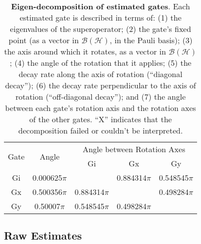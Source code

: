 \documentclass{article}[11pt]
\begin{document}
\begin{table}[h]
\begin{center}
\vspace{2em}
\begin{tabular}[l]{|c|c|c|c|c|}
\hline
\multirow{2}{*}{Gate} & \multirow{2}{*}{Angle} & \multicolumn{3}{c|}{Angle between Rotation Axes} \\ \cline{3-5}
 & & Gi & Gx & Gy \\ \hline
Gi & 0.000625$\pi$ &  & 0.884314$\pi$ & 0.548545$\pi$ \\ \hline
Gx & 0.500356$\pi$ & 0.884314$\pi$ &  & 0.498284$\pi$ \\ \hline
Gy & 0.50007$\pi$ & 0.548545$\pi$ & 0.498284$\pi$ &  \\ \hline
\end{tabular}

\caption{\textbf{Eigen-decomposition of estimated gates}.  Each estimated gate is described in terms of: (1) the eigenvalues of the superoperator; (2) the gate's fixed point (as a vector in $\mathcal{B}(\mathcal{H})$, in the Pauli basis); (3)  the axis around which it rotates, as a vector in $\mathcal{B}(\mathcal{H})$; (4) the angle of the rotation that it applies; (5) the decay rate along the axis of rotation (``diagonal decay''); (6) the decay rate perpendicular to the axis of rotation (``off-diagonal decay''); and (7) the angle between each gate's rotation axis and the rotation axes of the other gates.  ``X'' indicates that the decomposition failed or couldn't be interpreted. \label{bestGatesetDecompTable}}
\end{center}
\end{table}

\FloatBarrier

\subsection{Raw Estimates}
\end{document}
